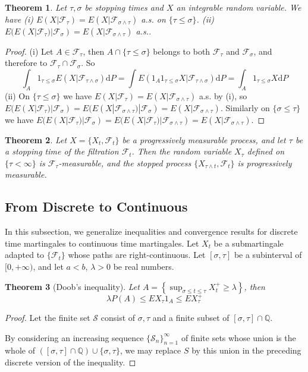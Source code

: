 \documentclass{article}
\newtheorem{Thm}{Theorem}[section]
\theoremstyle{definition}
\begin{document}
\begin{Thm}
    Let $\tau,\sigma$ be stopping times and $X$ an integrable random variable. We have \newline 
    (i) $E(X|\mathcal{F}_\tau)=E(X|\mathcal{F}_{\sigma\wedge \tau})$ a.s. on $\{\tau\le \sigma\}$.\newline 
    (ii) $E(E(X|\mathcal{F}_\tau)|\mathcal{F}_\sigma)=E(X|\mathcal{F}_{\sigma\wedge \tau})$ a.s..
\end{Thm}
\begin{proof}
    (i) Let $A\in\mathcal{F}_\tau$, then $A\cap \{\tau\le \sigma\}$ belongs to both $\mathcal{F}_\tau$ and $\mathcal{F}_\sigma$, and therefore to $\mathcal{F}_\tau\cap\mathcal{F}_\sigma$. So 
    \[ \int_A 1_{\tau\le \sigma} E(X|\mathcal{F}_{\tau\wedge\sigma})\mathrm{d}P=\int E(1_A1_{\tau\le \sigma}X|\mathcal{F}_{\tau\wedge\sigma})\mathrm{d}P=\int_A1_{\tau\le \sigma}X\mathrm{d}P\]
    (ii) On $\{\tau\le\sigma\}$ we have $E(X|\mathcal{F}_\tau)=E(X|\mathcal{F}_{\sigma\wedge \tau})$ a.s. by (i), so 
    $E(E(X|\mathcal{F}_\tau)|\mathcal{F}_\sigma)=E(E(X|\mathcal{F}_{\sigma\wedge \tau})|\mathcal{F}_\sigma)=E(X|\mathcal{F}_{\sigma\wedge \tau})$. Similarly on
    $\{\sigma\le \tau\}$ we have $E(E(X|\mathcal{F}_\tau)|\mathcal{F}_\sigma)=E(E(X|\mathcal{F}_\tau)|\mathcal{F}_{\sigma\wedge \tau})=E(X|\mathcal{F}_{\sigma\wedge \tau})$.
\end{proof}
\begin{Thm}
    Let $X=\{X_t,\mathcal{F}_t\}$ be a progressively measurable process, and let $\tau$ be a stopping time of the filtration $\mathcal{F}_t$.
    Then the random variable $X_\tau$ defined on $\{\tau<\infty\}$ is $\mathcal{F}_\tau$-measurable, and the stopped process 
    $\{X_{\tau\wedge t},\mathcal{F}_t\}$ is progressively measurable.
\end{Thm}



\subsection{From Discrete to Continuous}
In this subsection, we generalize inequalities and convergence results for discrete time martingales to continuous time martingales.\newline 
Let $X_t$ be a submartingale adapted to $\{\mathcal{F}_t\}$ whose paths are right-continuous. Let $[\sigma,\tau]$ be a subinterval of $[0,+\infty)$,
and let $a<b$, $\lambda>0$ be real numbers.
\begin{Thm}[Doob's inequality]
    Let $A=\left\{ \sup_{\sigma\le t\le \tau}X_t^+  \ge\lambda\right\}$, then \[\lambda P(A)\le EX_\tau1_A\le EX_\tau^+\]
\end{Thm}
\begin{proof}
    Let the finite set $\mathcal{S}$ consist of $\sigma,\tau$ and a finite subset of $[\sigma,\tau]\cap \mathbb{Q}$.

    By considering an increasing sequence $\{\mathcal{S}_n\}_{n=1}^\infty$ of finite sets whose union is the whole of $([\sigma,\tau]\cap \mathbb{Q})\cup\{\sigma,\tau\}$,
    we may replace $S$ by this union in the preceding discrete version of the inequality.
\end{proof}
\end{document}
